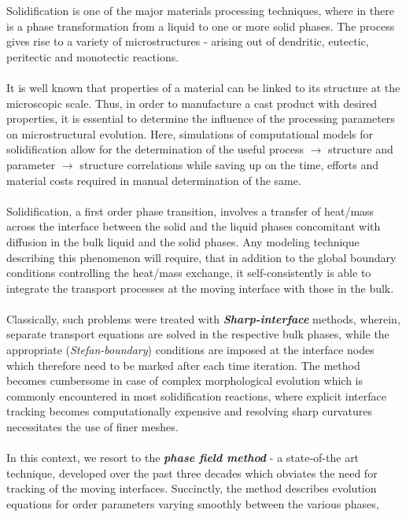 \documentclass[12pt,a4paper]{report}
\begin{document}
Solidification is one of the major materials processing 
techniques, where in there is a phase transformation from a 
liquid to one or more solid phases. The process gives rise to 
a variety of microstructures - arising out of dendritic, 
eutectic, peritectic and monotectic reactions.\\
\\
It is well known that properties of a material can be linked 
to its structure at the microscopic scale. Thus, in order to 
manufacture a cast product with desired properties, it is 
essential to determine the influence of the processing parameters 
on microstructural evolution. Here, simulations of computational 
models for solidification allow for the determination of the 
useful process $\rightarrow$ structure and parameter $\rightarrow$ 
structure correlations while saving up on the time, efforts and 
material costs required in manual determination of the same.\\
\\
Solidification, a first order phase transition, involves a 
transfer of heat/mass across the interface between the solid 
and the liquid phases concomitant with diffusion in the bulk 
liquid and the solid phases. Any modeling technique describing 
this phenomenon will require, that in addition to the global 
boundary conditions controlling the heat/mass exchange, it 
self-consistently is able to integrate the transport processes 
at the moving interface with those in the bulk.\\
\\
Classically, such problems were treated with 
\textbf{\textit{Sharp-interface}} methods, wherein, separate 
transport equations are solved in the respective bulk phases, while the appropriate (\textit{Stefan-boundary}) conditions 
are imposed at the interface nodes which therefore need to be
marked after each time iteration. The method becomes cumbersome
in case of complex morphological evolution which 
is commonly encountered in most solidification reactions, where
explicit interface tracking becomes computationally expensive
and resolving sharp curvatures necessitates the use of finer
meshes.\\
\\
In this context, we resort to the 
\textbf{\textit{phase field method}} - a state-of-the art
technique, developed over the past three decades which 
obviates the need for tracking of the moving interfaces.
Succinctly, the method describes evolution equations for 
order parameters varying smoothly between the various phases,
\end{document}
